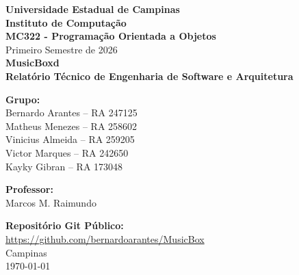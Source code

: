 \documentclass[12pt,a4paper]{article}
\begin{document}
\begin{titlepage}
    \centering
    \vspace*{1cm}
    {\large \textbf{Universidade Estadual de Campinas}}\\
    {\large \textbf{Instituto de Computação}}\\
    \vspace*{1.5cm}
    \vspace*{1cm}
    {\large \textbf{MC322 - Programação Orientada a Objetos}}\\
    {\large Primeiro Semestre de 2026}\\
    \vspace*{2cm}
    {\Huge \bfseries MusicBoxd} \\
    \vspace*{0.5cm}
    {\Large \textbf{Relatório Técnico de Engenharia de Software e Arquitetura}} \\
    \vspace*{2cm}
    
    \begin{minipage}{0.6\textwidth}
        \begin{flushleft} \large
            \textbf{Grupo:}\\
            Bernardo Arantes -- RA 247125\\
            Matheus Menezes -- RA 258602\\
            Vinicius Almeida -- RA 259205\\
            Victor Marques -- RA 242650\\
            Kayky Gibran -- RA 173048
        \end{flushleft}
    \end{minipage}
    \begin{minipage}{0.35\textwidth}
        \begin{flushright} \large
            \textbf{Professor:}\\
            Marcos M. Raimundo
        \end{flushright}
    \end{minipage}
    
    \vfill
    {\large \textbf{Repositório Git Público:}}\\
    \vspace*{0.2cm}
    \url{https://github.com/bernardoarantes/MusicBox}\\
    \vspace*{1.5cm}
    {\large Campinas\\ \today}
\end{titlepage}
\end{document}
